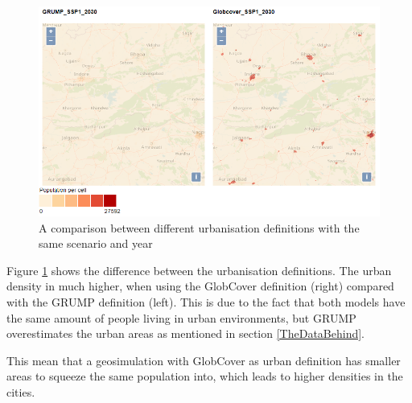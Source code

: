\begin{figure} [H]
	\centering
	\includegraphics[width=.8\textwidth]{Pictures/GlobcoverVsGrump}
	\caption{A comparison between different urbanisation definitions with the same scenario and year}
	\label{GlobcoverVsGrump}
\end{figure}

Figure \ref{GlobcoverVsGrump} shows the difference between the urbanisation definitions. The urban density in much higher, when using the GlobCover definition (right) compared with the GRUMP definition (left). This is due to the fact that both models have the same amount of people living in urban environments, but GRUMP overestimates the urban areas as mentioned in section \ref{TheDataBehind}.  

This mean that a geosimulation with GlobCover as urban definition has smaller areas to squeeze the same population into, which leads to higher densities in the cities.

